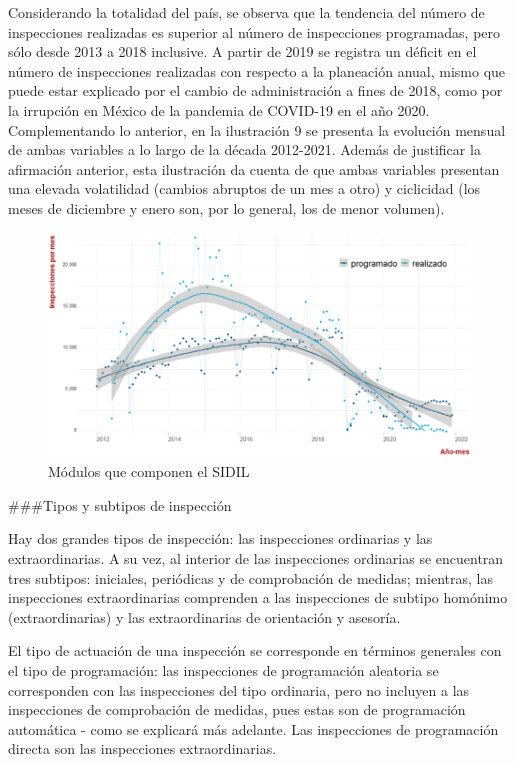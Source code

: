 \documentclass[
]{article}
\begin{document}
Considerando la totalidad del país, se observa que la tendencia del número de inspecciones realizadas es superior al número de inspecciones programadas, pero sólo desde 2013 a 2018 inclusive. A partir de 2019 se registra un déficit en el número de inspecciones realizadas con respecto a la planeación anual, mismo que puede estar explicado por el cambio de administración a fines de 2018, como por la irrupción en México de la pandemia de COVID-19 en el año 2020. Complementando lo anterior, en la ilustración 9 se presenta la evolución mensual de ambas variables a lo largo de la década 2012-2021. Además de justificar la afirmación anterior, esta ilustración da cuenta de que ambas variables presentan una elevada volatilidad (cambios abruptos de un mes a otro) y ciclicidad (los meses de diciembre y enero son, por lo general, los de menor volumen).

\begin{figure}
\includegraphics[width=12.56in]{images-1/08/programadorealizado} \caption{Módulos que componen el SIDIL}\label{fig:programadorealizado}
\end{figure}

\#\#\#Tipos y subtipos de inspección

Hay dos grandes tipos de inspección: las inspecciones ordinarias y las extraordinarias. A su vez, al interior de las inspecciones ordinarias se encuentran tres subtipos: iniciales, periódicas y de comprobación de medidas; mientras, las inspecciones extraordinarias comprenden a las inspecciones de subtipo homónimo (extraordinarias) y las extraordinarias de orientación y asesoría.

El tipo de actuación de una inspección se corresponde en términos generales con el tipo de programación: las inspecciones de programación aleatoria se corresponden con las inspecciones del tipo ordinaria, pero no incluyen a las inspecciones de comprobación de medidas, pues estas son de programación automática - como se explicará más adelante. Las inspecciones de programación directa son las inspecciones extraordinarias.
\end{document}
